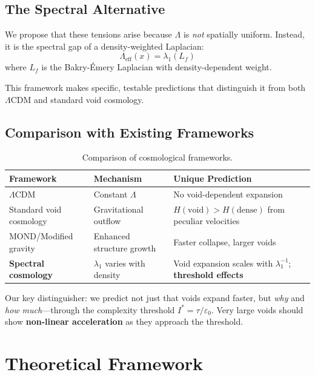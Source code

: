 \documentclass[11pt,a4paper]{article}
\theoremstyle{plain}
\theoremstyle{definition}
\theoremstyle{remark}
\begin{document}
\subsection{The Spectral Alternative}

We propose that these tensions arise because $\Lambda$ is \emph{not} spatially uniform. Instead, it is the spectral gap of a density-weighted Laplacian:
\[
\Lambda_{\text{eff}}(x) = \lambda_1(L_f)
\]
where $L_f$ is the Bakry-\'{E}mery Laplacian with density-dependent weight.

This framework makes specific, testable predictions that distinguish it from both $\Lambda$CDM and standard void cosmology.

\subsection{Comparison with Existing Frameworks}

\begin{table}[h]
\centering
\begin{tabular}{@{}llp{5cm}@{}}
\toprule
\textbf{Framework} & \textbf{Mechanism} & \textbf{Unique Prediction} \\
\midrule
$\Lambda$CDM & Constant $\Lambda$ & No void-dependent expansion \\
Standard void cosmology & Gravitational outflow & $H(\text{void}) > H(\text{dense})$ from peculiar velocities \\
MOND/Modified gravity & Enhanced structure growth & Faster collapse, larger voids \\
\textbf{Spectral cosmology} & $\lambda_1$ varies with density & Void expansion scales with $\lambda_1^{-1}$; \textbf{threshold effects} \\
\bottomrule
\end{tabular}
\caption{Comparison of cosmological frameworks.}
\label{tab:comparison}
\end{table}

Our key distinguisher: we predict not just that voids expand faster, but \emph{why} and \emph{how much}---through the complexity threshold $I^* = \tau/\varepsilon_0$. Very large voids should show \textbf{non-linear acceleration} as they approach the threshold.

\section{Theoretical Framework}
\end{document}
